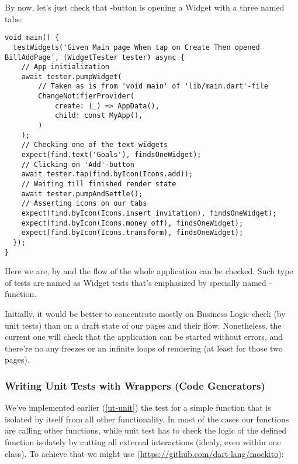 \noindent By now, let's just check that -button is opening a Widget with a three named tabs:

\begin{lstlisting}
void main() {
  testWidgets('Given Main page When tap on Create Then opened BillAddPage', (WidgetTester tester) async {
    // App initialization
    await tester.pumpWidget(
        // Taken as is from 'void main' of 'lib/main.dart'-file
        ChangeNotifierProvider(
            create: (_) => AppData(),
            child: const MyApp(),
        )
    );
    // Checking one of the text widgets
    expect(find.text('Goals'), findsOneWidget);
    // Clicking on 'Add'-button
    await tester.tap(find.byIcon(Icons.add));
    // Waiting till finished render state
    await tester.pumpAndSettle();
    // Asserting icons on our tabs
    expect(find.byIcon(Icons.insert_invitation), findsOneWidget);
    expect(find.byIcon(Icons.money_off), findsOneWidget);
    expect(find.byIcon(Icons.transform), findsOneWidget);
  });
}
\end{lstlisting}

Here we are, by  and  the flow of the whole application can be checked. Such type of tests are named as 
Widget tests that's emphasized by specially named -function.

Initially, it would be better to concentrate mostly on Business Logic check (by unit tests) than on a draft state of 
our pages and their flow. Nonetheless, the current one will check that the application can be started without errors, 
and there're no any freezes or an infinite loops of rendering (at least for those two pages). 


\subsubsection{Writing Unit Tests with Wrappers (Code Generators)} \label{ut-code-generator}

We've implemented earlier (\ref{ut-unit}) the test for a simple function that is isolated by itself from all other functionality. 
In most of the cases our functions are calling other functions, while unit test has to check the logic of the defined 
function isolately by cutting all external interactions (idealy, even within one class). To achieve that we might
use  (\href{https://github.com/dart-lang/mockito}{https://github.com/dart-lang/mockito}):

